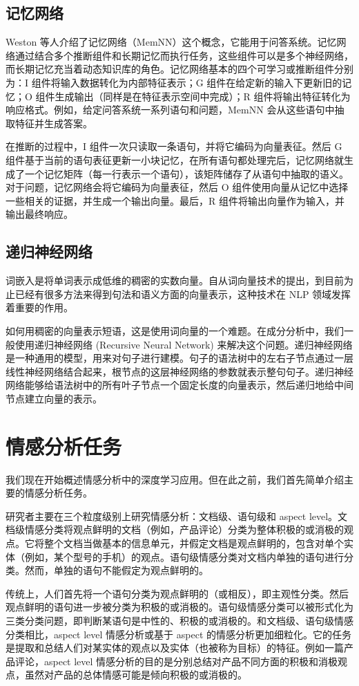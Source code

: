 \documentclass[lang=cn,11pt,a4paper]{elegantpaper}
\begin{document}
\subsection{记忆网络}
Weston 等人介绍了记忆网络（MemNN）这个概念，它能用于问答系统。记忆网络通过结合多个推断组件和长期记忆而执行任务，这些组件可以是多个神经网络，而长期记忆充当着动态知识库的角色。记忆网络基本的四个可学习或推断组件分别为：I 组件将输入数据转化为内部特征表示；G 组件在给定新的输入下更新旧的记忆；O 组件生成输出（同样是在特征表示空间中完成）；R 组件将输出特征转化为响应格式。例如，给定问答系统一系列语句和问题，MemNN 会从这些语句中抽取特征并生成答案。

在推断的过程中，I 组件一次只读取一条语句，并将它编码为向量表征。然后 G 组件基于当前的语句表征更新一小块记忆，在所有语句都处理完后，记忆网络就生成了一个记忆矩阵（每一行表示一个语句），该矩阵储存了从语句中抽取的语义。对于问题，记忆网络会将它编码为向量表征，然后 O 组件使用向量从记忆中选择一些相关的证据，并生成一个输出向量。最后，R 组件将输出向量作为输入，并输出最终响应。
\subsection{递归神经网络}
词嵌入是将单词表示成低维的稠密的实数向量。自从词向量技术的提出，到目前为止已经有很多方法来得到句法和语义方面的向量表示，这种技术在 NLP 领域发挥着重要的作用。

如何用稠密的向量表示短语，这是使用词向量的一个难题。在成分分析中，我们一般使用递归神经网络 (Recursive Neural Network) 来解决这个问题。递归神经网络是一种通用的模型，用来对句子进行建模。句子的语法树中的左右子节点通过一层线性神经网络结合起来，根节点的这层神经网络的参数就表示整句句子。递归神经网络能够给语法树中的所有叶子节点一个固定长度的向量表示，然后递归地给中间节点建立向量的表示。

\section{情感分析任务}
我们现在开始概述情感分析中的深度学习应用。但在此之前，我们首先简单介绍主要的情感分析任务。

研究者主要在三个粒度级别上研究情感分析：文档级、语句级和 aspect level。文档级情感分类将观点鲜明的文档（例如，产品评论）分类为整体积极的或消极的观点。它将整个文档当做基本的信息单元，并假定文档是观点鲜明的，包含对单个实体（例如，某个型号的手机）的观点。语句级情感分类对文档内单独的语句进行分类。然而，单独的语句不能假定为观点鲜明的。

传统上，人们首先将一个语句分类为观点鲜明的（或相反），即主观性分类。然后观点鲜明的语句进一步被分类为积极的或消极的。语句级情感分类可以被形式化为三类分类问题，即判断某语句是中性的、积极的或消极的。和文档级、语句级情感分类相比，aspect level 情感分析或基于 aspect 的情感分析更加细粒化。它的任务是提取和总结人们对某实体的观点以及实体（也被称为目标）的特征。例如一篇产品评论，aspect level 情感分析的目的是分别总结对产品不同方面的积极和消极观点，虽然对产品的总体情感可能是倾向积极的或消极的。
\end{document}
